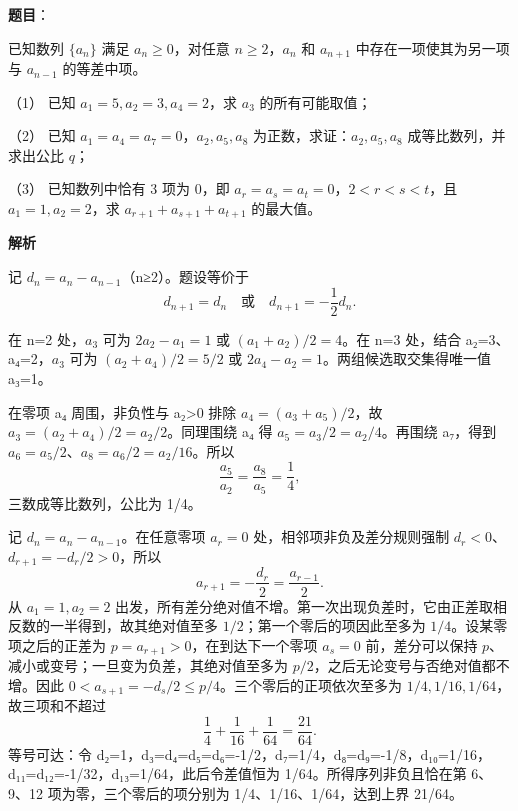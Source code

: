 \begin{answer}

\textbf{题目}：

已知数列 $\{a_n\}$ 满足 $a_n\ge0$，对任意 $n\ge2$，$a_n$ 和 $a_{n+1}$ 中存在一项使其为另一项与 $a_{n-1}$ 的等差中项。

（1） 已知 $a_1=5,a_2=3,a_4=2$，求 $a_3$ 的所有可能取值；

（2） 已知 $a_1=a_4=a_7=0$，$a_2,a_5,a_8$ 为正数，求证：$a_2,a_5,a_8$ 成等比数列，并求出公比 $q$；

（3） 已知数列中恰有 3 项为 0，即 $a_r=a_s=a_t=0$，$2<r<s<t$，且 $a_1=1,a_2=2$，求 $a_{r+1}+a_{s+1}+a_{t+1}$ 的最大值。

\textbf{解析}

记 \(d_n=a_n-a_{n-1}\)（n≥2）。题设等价于
\nopagebreak[4]
\[
d_{n+1}=d_n\quad\text{或}\quad d_{n+1}=-\frac12d_n.
\]


在 n=2 处，\(a_3\) 可为 \(2a_2-a_1=1\) 或 \((a_1+a_2)/2=4\)。在 n=3 处，结合 a₂=3、a₄=2，\(a_3\) 可为 \((a_2+a_4)/2=5/2\) 或 \(2a_4-a_2=1\)。两组候选取交集得唯一值 a₃=1。


在零项 a₄ 周围，非负性与 a₂>0 排除 \(a_4=(a_3+a_5)/2\)，故 \(a_3=(a_2+a_4)/2=a_2/2\)。同理围绕 a₄ 得 \(a_5=a_3/2=a_2/4\)。再围绕 a₇，得到 \(a_6=a_5/2\)、\(a_8=a_6/2=a_2/16\)。所以
\nopagebreak[4]
\[
\frac{a_5}{a_2}=\frac{a_8}{a_5}=\frac14,
\]
三数成等比数列，公比为 1/4。


记 \(d_n=a_n-a_{n-1}\)。在任意零项 \(a_r=0\) 处，相邻项非负及差分规则强制 \(d_r<0\)、\(d_{r+1}=-d_r/2>0\)，所以
\nopagebreak[4]
\[
a_{r+1}=-\frac{d_r}{2}=\frac{a_{r-1}}2.
\]
从 \(a_1=1,a_2=2\) 出发，所有差分绝对值不增。第一次出现负差时，它由正差取相反数的一半得到，故其绝对值至多 \(1/2\)；第一个零后的项因此至多为 \(1/4\)。设某零项之后的正差为 \(p=a_{r+1}>0\)，在到达下一个零项 \(a_s=0\) 前，差分可以保持 \(p\)、减小或变号；一旦变为负差，其绝对值至多为 \(p/2\)，之后无论变号与否绝对值都不增。因此 \(0<a_{s+1}=-d_s/2\le p/4\)。三个零后的正项依次至多为 \(1/4,1/16,1/64\)，故三项和不超过
\nopagebreak[4]
\[
\frac14+\frac1{16}+\frac1{64}=\frac{21}{64}.
\]
等号可达：令 d₂=1，d₃=d₄=d₅=d₆=-1/2，d₇=1/4，d₈=d₉=-1/8，d₁₀=1/16，d₁₁=d₁₂=-1/32，d₁₃=1/64，此后令差值恒为 1/64。所得序列非负且恰在第 6、9、12 项为零，三个零后的项分别为 1/4、1/16、1/64，达到上界 21/64。




\end{answer}